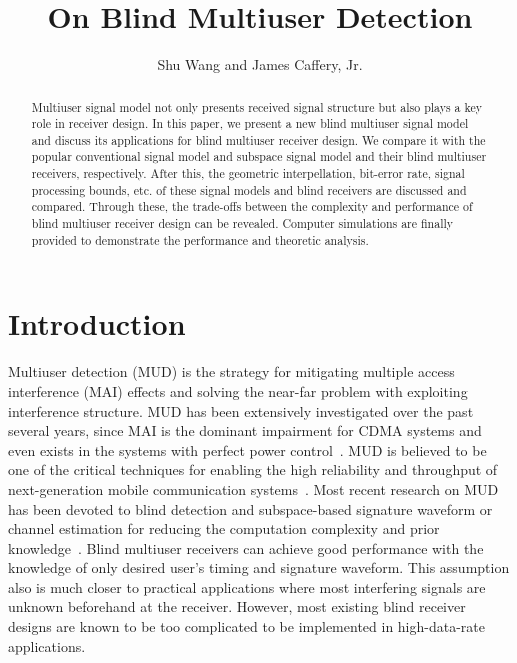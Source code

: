 \documentclass[a4paper,10pt,fleqn, twocolumn]{IEEETran}
\title{On Blind Multiuser Detection}
\author{Shu Wang and James Caffery, Jr.}
\date{}
\begin{document}
\maketitle
\begin{abstract}\small
Multiuser signal model not only presents received signal structure
but also plays a key role in receiver design. In this paper, we
present a new blind multiuser signal model and discuss its
applications for blind multiuser receiver design. We compare it
with the popular conventional signal model and subspace signal
model and their blind multiuser receivers, respectively. After
this, the geometric interpellation, bit-error rate, signal
processing bounds, etc. of these signal models and blind receivers
are discussed and compared. Through these, the trade-offs between
the complexity and performance of blind multiuser receiver design
can be revealed. Computer simulations are finally provided to
demonstrate the performance and theoretic analysis.
\end{abstract}

\section{Introduction}
Multiuser detection (MUD) is the strategy for mitigating multiple
access interference (MAI) effects and solving the near-far problem
with exploiting interference structure. MUD has been extensively
investigated over the past several years, since MAI is the
dominant impairment for CDMA systems and even exists in the
systems with perfect power control~\cite{Verd98}. MUD is believed
to be one of the critical techniques for enabling the high
reliability and throughput of next-generation mobile communication
systems~\cite{Andr05}. Most recent research on MUD has been
devoted to blind detection and subspace-based signature waveform
or channel estimation for reducing the computation complexity and
prior
knowledge~\cite{Madh94,Honi95,Torl97,Wang98,Zhang02,Wang05B}.
Blind multiuser receivers can achieve good performance with the
knowledge of only desired user's timing and signature waveform.
This assumption also is much closer to practical applications
where most interfering signals are unknown beforehand at the
receiver. However, most existing blind receiver designs are known
to be too complicated to be implemented in high-data-rate
applications.
\end{document}
